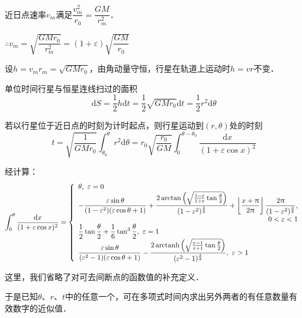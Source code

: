 \documentclass[UTF8,fontset=none,linespread=1.2]{ctexart}
\DeclareMathOperator{\arctanh}{arctanh}
\newcommand{\upd}{\mathrm{d}}
\begin{document}
近日点速率$v_m$满足$\dfrac{v_m^2}{r_0}=\dfrac{GM}{r_m^2}$．

$\therefore v_m=\sqrt{\dfrac{GMr_0}{r_m^2}}=(1+\varepsilon)\sqrt{\dfrac{GM}{r_0}}$

设$h=v_mr_m=\sqrt{GMr_0}$，由角动量守恒，行星在轨道上运动时$h=vr$不变．

单位时间行星与恒星连线扫过的面积$$\upd S=\dfrac12h\upd t=\dfrac12\sqrt{GMr_0}\upd t=\dfrac12r^2\upd\theta$$

若以行星位于近日点的时刻为计时起点，则行星运动到$(r,\theta)$处的时刻$$t=\sqrt{\dfrac{1}{GMr_0}}\int_{\theta_0}^{\theta}r^2\upd \theta=r_0\sqrt{\dfrac{r_0}{GM}}\int_0^{\theta-\theta_0}\dfrac{\upd x}{(1+\varepsilon\cos x)^2}$$

经计算：$$\int_0^{\theta}\dfrac{\upd x}{(1+\varepsilon\cos x)^2}=\left\lbrace\begin{array}{l}
\theta,\ \varepsilon=0\\
-\dfrac{\varepsilon\sin\theta}{(1-\varepsilon^2)(\varepsilon\cos\theta+1)}+\dfrac{2\arctan\left(\sqrt{\frac{1-\varepsilon}{1+\varepsilon}\tan\frac\theta2}\right)}{(1-\varepsilon^2)^{\frac32}}+\left\lfloor\dfrac{x+\uppi}{2\uppi}\right\rfloor\dfrac{2\uppi}{(1-\varepsilon^2)^{\frac32}},\\
\hspace*{\fill} 0<\varepsilon<1\\
\dfrac12\tan\dfrac\theta2+\dfrac16\tan^3\dfrac\theta2,\ \varepsilon=1\\
\dfrac{\varepsilon\sin\theta}{(\varepsilon^2-1)(\varepsilon\cos\theta+1)}-\dfrac{2\arctanh\left(\sqrt{\frac{\varepsilon-1}{\varepsilon+1}\tan\frac\theta2}\right)}{(\varepsilon^2-1)^{\frac32}},\ \varepsilon>1\\
\end{array}\right.$$

这里，我们省略了对可去间断点的函数值的补充定义．

于是已知$\theta$、$r$、$t$中的任意一个，可在多项式时间内求出另外两者的有任意数量有效数字的近似值．
\end{document}

